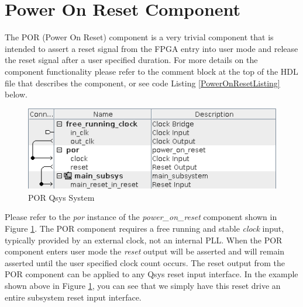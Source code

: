 \documentclass{article}
\begin{document}
\section*{Power On Reset Component}
\begin{flushleft}
\noindent
The POR (Power On Reset) component is a very trivial component that is intended to assert a reset signal from the FPGA entry into user mode and release the reset signal after a user specified duration.  For more details on the component functionality please refer to the comment block at the top of the HDL file that describes the component, or see code Listing \ref{PowerOnResetListing} below.

\begin{figure}[H]
\centering
\includegraphics[scale=0.675]{por_qsys}
\caption{POR Qsys System}
\label{fig:por_qsys}
\end{figure}

Please refer to the \emph{por} instance of the \emph{power\_on\_reset} component shown in Figure \ref{fig:por_qsys}.  The POR component requires a free running and stable \emph{clock} input, typically provided by an external clock, not an internal PLL.  When the POR component enters user mode the \emph{reset} output will be asserted and will remain asserted until the user specified clock count occurs.  The reset output from the POR component can be applied to any Qsys reset input interface.  In the example shown above in Figure \ref{fig:por_qsys}, you can see that we simply have this reset drive an entire subsystem reset input interface.


\end{flushleft}
\end{document}
